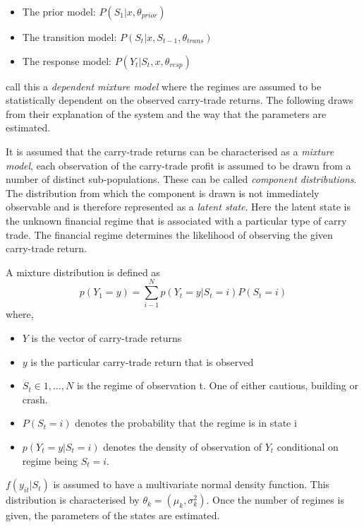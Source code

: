 \documentclass[12pt, a4paper, oneside]{article} %
\begin{document}
\begin{itemize}
\item The prior model: $P(S_1|x, \theta_{prior})$
\item The transition model: $P(S_t|x, S_{t-1}, \theta_{trans})$
\item The response model: $P(Y_t| S_t, x, \theta_{resp})$
\end{itemize}


 \citet{depmixS4} call this a \emph{dependent mixture model} where the regimes are assumed to be statistically dependent on the observed carry-trade returns. The following draws from their explanation of the system and the way that the parameters are estimated.  

It is assumed that the carry-trade returns can be characterised as a \emph{mixture model}, each observation of the carry-trade profit is assumed to be drawn from a number of distinct sub-populations.  These can be called \emph{component distributions}.  The distribution from which the component is drawn is not immediately observable and is therefore represented as a \emph{latent state}.  Here the latent state is the unknown financial regime that is associated with a particular type of carry trade.  The financial regime determines the likelihood of observing the given carry-trade return. 

A mixture distribution is defined as 
\begin{equation}
p(Y_1 = y) = \sum_{i - 1}^N p(Y_t = y|S_t = i)P(S_t = i)
\end{equation}
where,
\begin{itemize}
\item $Y$ is the vector of carry-trade returns
\item $y$ is the particular carry-trade return that is observed
\item $S_t \in {1, \dots, N}$ is the regime of observation t.  One of either cautious, building or crash.
\item $P(S_t = i)$ denotes the probability that the regime is in state i 
\item $p(Y_t = y|S_t = i)$ denotes the density of observation of $Y_t$ conditional on regime being $S_t = i$.
\end{itemize}


$f(y_{it}|S_t)$ is assumed to have a multivariate normal density function. This distribution is characterised by $\theta_k = (\mu_k, \sigma_k^2)$. Once the number of regimes is given, the parameters of the states are estimated.  
\end{document}
